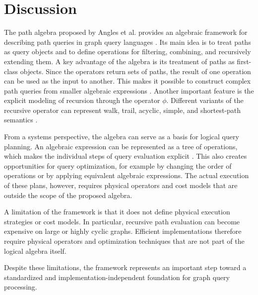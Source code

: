 \section{Discussion}

The path algebra proposed by Angles et al. provides an algebraic framework for describing path queries in graph query languages \cite{angles2024path}. Its main idea is to treat paths as query objects and to define operations for filtering, combining, and recursively extending them.
A key advantage of the algebra is its treatment of paths as first-class objects. Since the operators return sets of paths, the result of one operation can be used as the input to another. This makes it possible to construct complex path queries from smaller algebraic expressions \cite{angles2024path}.
Another important feature is the explicit modeling of recursion through the operator $\phi$. Different variants of the recursive operator can represent walk, trail, acyclic, simple, and shortest-path semantics \cite{angles2024path}.

From a systems perspective, the algebra can serve as a basis for logical query planning. An algebraic expression can be represented as a tree of operations, which makes the individual steps of query evaluation explicit \cite{angles2024path}.
This also creates opportunities for query optimization, for example by changing the order of operations or by applying equivalent algebraic expressions. The actual execution of these plans, however, requires physical operators and cost models that are outside the scope of the proposed algebra.

A limitation of the framework is that it does not define physical execution strategies or cost models. In particular, recursive path evaluation can become expensive on large or highly cyclic graphs. Efficient implementations therefore require physical operators and optimization techniques that are not part of the logical algebra itself.

Despite these limitations, the framework represents an important step toward a standardized and implementation-independent foundation for graph query processing.